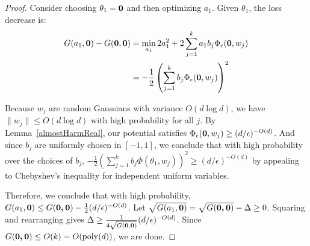 \AlmostHarmInitialize*

 \begin{proof}
  Consider choosing $\theta_1 = {\bf 0}$ and then
  optimizing $a_1$. Given $\theta_1$, the loss decrease is:
%
\begin{align*}
   G(a_1,{\bf 0}) - G({\bf 0},{\bf 0}) & = \min_{a_1} 2a_1^2 +
  2\sum_{j=1}^k a_1 b_j\Phi_\epsilon({\bf 0},w_j) \\
 & = -\frac{1}{2}\left(  \sum_{j=1}^k b_j
   \Phi_\epsilon({\bf 0},w_j)\right)^2 
\end{align*}

Because $w_j$ are random Gaussians with variance $O(d \log d)$, we have $\|w_j\| \leq O(d\log d)$ with high probability for all $j$. By Lemma~\ref{almostHarmReal}, our potential satisfies ${\Phi}_\epsilon({\bf 0}, w_j) \geq (d/\epsilon)^{ - O(d)}$. And since $b_j$ are uniformly chosen in $[-1,1]$, we conclude that with high probability over the choices of $b_j$, $-\frac{1}{2}\left(  \sum_{j=1}^k b_j\Phi(\theta_1,w_j)\right)^2 \geq (d/\epsilon)^{ - O(d)}$ by appealing to Chebyshev's inequality for independent uniform variables.

Therefore, we conclude that with high probability, $G(a_1, {\bf 0}) \leq G(\boldsymbol{0,0}) - \frac{1}{2}(d/\epsilon)^{ - O(d)}$. Let $\sqrt{G(a_1, {\bf 0})} = \sqrt{G(\boldsymbol{0,0})} - \Delta \geq 0$. Squaring and rearranging gives $\Delta \geq \frac{1}{4\sqrt{G({\bf 0, 0})}}(d/\epsilon)^{ - O(d)}$. Since $G(\boldsymbol{0,0}) \leq O(k) = O(\mathrm{poly}(d))$, we are done. 

%
%
\end{proof}


